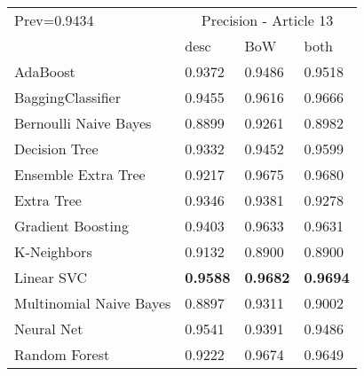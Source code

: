 \begin{tabular}{|l|l|l|l| }
\hline
Prev=0.9434 &  \multicolumn{3}{c|}{Precision - Article 13} \\
\cline{2-4} & desc & BoW & both \\ \hline
AdaBoost                & 0.9372 & 0.9486 & 0.9518\\
BaggingClassifier       & 0.9455 & 0.9616 & 0.9666\\
Bernoulli Naive Bayes   & 0.8899 & 0.9261 & 0.8982\\
Decision Tree           & 0.9332 & 0.9452 & 0.9599\\
Ensemble Extra Tree     & 0.9217 & 0.9675 & 0.9680\\
Extra Tree              & 0.9346 & 0.9381 & 0.9278\\
Gradient Boosting       & 0.9403 & 0.9633 & 0.9631\\
K-Neighbors             & 0.9132 & 0.8900 & 0.8900\\
Linear SVC              & {\bf 0.9588} & {\bf 0.9682} & {\bf 0.9694}\\
Multinomial Naive Bayes & 0.8897 & 0.9311 & 0.9002\\
Neural Net              & 0.9541 & 0.9391 & 0.9486\\
Random Forest           & 0.9222 & 0.9674 & 0.9649\\
\hline
\end{tabular}